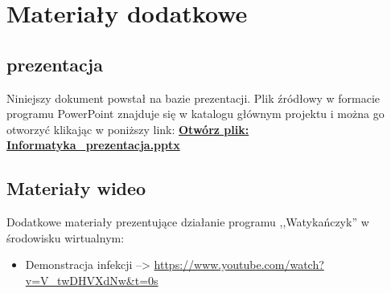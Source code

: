 \chapter{Materiały dodatkowe}
\section{prezentacja}
Niniejszy dokument powstał na bazie prezentacji. Plik źródłowy w formacie programu PowerPoint znajduje się w katalogu głównym projektu i można go otworzyć klikając w poniższy link:
\href{Informatyka_prezentacja.pptx}{\textbf{Otwórz plik: Informatyka\_prezentacja.pptx}}

\section{Materiały wideo}
\label{zal:watykanczyk}
Dodatkowe materiały prezentujące działanie programu ,,Watykańczyk'' w środowisku wirtualnym:
\begin{itemize}
    \item Demonstracja infekcji --> \url{https://www.youtube.com/watch?v=V_twDHVXdNw&t=0s}
\end{itemize}